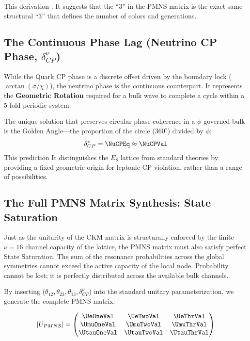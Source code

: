 This derivation \ReactorAngleAccText. It suggests that the ``3'' in the PMNS matrix is the exact same structural ``3'' that defines the number of colors and generations.

\subsection{The Continuous Phase Lag (Neutrino CP Phase, \texorpdfstring{$\delta_{CP}^\nu$}{delta cpnu})}

While the Quark CP phase is a discrete offset driven by the boundary lock ($\arctan(\sigma/\chi)$), the neutrino phase is the continuous counterpart. It represents the \textbf{Geometric Rotation} required for a bulk wave to complete a cycle within a 5-fold periodic system. 

The unique solution that preserves circular phase-coherence in a $\phi$-governed bulk is the Golden Angle—the proportion of the circle ($360^\circ$) divided by $\phi$:
\begin{equation}
    \delta_{CP}^\nu = \NuCPEq \approx \mathbf{\NuCPVal}
\end{equation}
This prediction \NuCPAccText It distinguishes the $E_8$ lattice from standard theories by providing a fixed geometric origin for leptonic CP violation, rather than a range of possibilities.

\subsection{The Full PMNS Matrix Synthesis: State Saturation}

Just as the unitarity of the CKM matrix is structurally enforced by the finite $\nu=16$ channel capacity of the lattice, the PMNS matrix must also satisfy perfect State Saturation. The sum of the resonance probabilities across the global symmetries cannot exceed the active capacity of the local node. Probability cannot be lost; it is perfectly distributed across the available bulk channels.

By inserting ($\theta_{12}, \theta_{23}, \theta_{13}, \delta_{CP}^\nu$) into the standard unitary parameterization, we generate the complete PMNS matrix:

\begin{equation}
|U_{PMNS}| =
\begin{pmatrix}
\mathbf{\UeOneVal} & \mathbf{\UeTwoVal} & \mathbf{\UeThrVal} \\
\mathbf{\UmuOneVal} & \mathbf{\UmuTwoVal} & \mathbf{\UmuThrVal} \\
\mathbf{\UtauOneVal} & \mathbf{\UtauTwoVal} & \mathbf{\UtauThrVal}
\end{pmatrix}
\end{equation}

